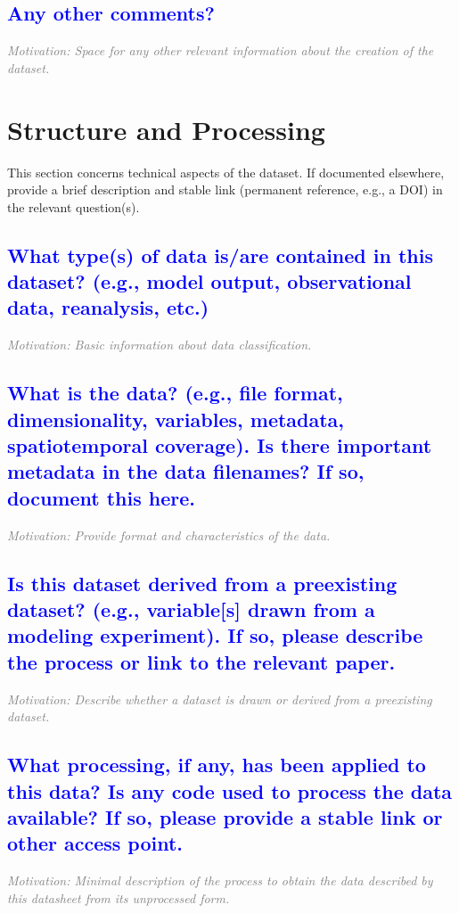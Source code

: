 \documentclass[letterpaper, 10 pt, transmag]{IEEEtran}
\begin{document}
\textcolor{blue}{\subsection{Any other comments?}}
\textcolor{gray}{\textit{Motivation: Space for any other relevant information about the creation of the dataset.}}  

\vspace{10mm}

\section{Structure and Processing}
This section concerns technical aspects of the dataset. If documented elsewhere, provide a brief description and stable link (permanent reference, e.g., a DOI) in the relevant question(s).

\textcolor{blue}{\subsection{What type(s) of data is/are contained in this dataset? (e.g., model output, observational data, reanalysis, etc.)}}
\textcolor{gray}{\textit{Motivation: Basic information about data classification.}}

\textcolor{blue}{\subsection{What is the data? (e.g., file format, dimensionality, variables, metadata, spatiotemporal coverage). Is there important metadata in the data filenames? If so, document this here.}}
\textcolor{gray}{\textit{Motivation: Provide format and characteristics of the data.}}

\textcolor{blue}{\subsection{Is this dataset derived from a preexisting dataset? (e.g., variable[s] drawn from a modeling experiment). If so, please describe the process or link to the relevant paper.}} 
\textcolor{gray}{\textit{Motivation: Describe whether a dataset is drawn or derived from a preexisting dataset.}}

\textcolor{blue}{\subsection{What processing, if any, has been applied to this data? Is any code used to process the data available? If so, please provide a stable link or other access point.}}
\textcolor{gray}{\textit{Motivation: Minimal description of the process to obtain the data described by this datasheet from its unprocessed form.}}
\end{document}
